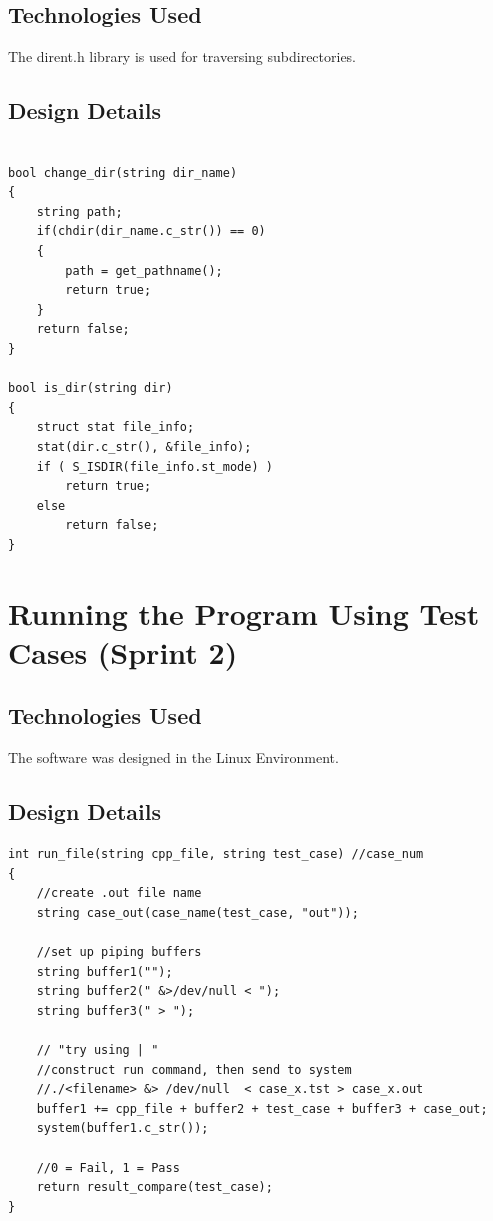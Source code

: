 \subsection{Technologies  Used}
The dirent.h library is used for traversing subdirectories.

\subsection{Design Details}

\begin{lstlisting}

bool change_dir(string dir_name)
{
    string path;
    if(chdir(dir_name.c_str()) == 0) 
    {
        path = get_pathname();
        return true;
    }
    return false;
}

bool is_dir(string dir)
{
    struct stat file_info;
    stat(dir.c_str(), &file_info);
    if ( S_ISDIR(file_info.st_mode) ) 
        return true;
    else 
        return false;
}
\end{lstlisting}

\section{Running the Program Using Test Cases (Sprint 2)}

\subsection{Technologies  Used}
The software was designed in the Linux Environment.


\subsection{Design Details}


\begin{lstlisting}
int run_file(string cpp_file, string test_case) //case_num
{
    //create .out file name
    string case_out(case_name(test_case, "out"));

    //set up piping buffers
    string buffer1("");
    string buffer2(" &>/dev/null < ");
    string buffer3(" > ");

    // "try using | "
    //construct run command, then send to system
    //./<filename> &> /dev/null  < case_x.tst > case_x.out
    buffer1 += cpp_file + buffer2 + test_case + buffer3 + case_out;
    system(buffer1.c_str());

    //0 = Fail, 1 = Pass
    return result_compare(test_case);
}
\end{lstlisting}

